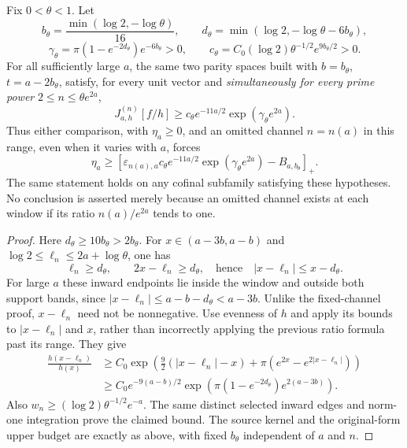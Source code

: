 \begin{proposition}
\label{prop:ns43-moving-channel}
Fix $0<\theta<1$. Let
\[
 b_\theta=\frac{\min(\log2,-\log\theta)}{16},\qquad
 d_\theta=\min(\log2,-\log\theta-6b_\theta),
\]
\[
 \gamma_\theta=\pi(1-e^{-2d_\theta})e^{-6b_\theta}>0,
 \qquad c_\theta=C_0(\log2)\theta^{-1/2}e^{9b_\theta/2}>0.
\]
For all sufficiently large $a$, the same two parity spaces built with
$b=b_\theta$, $t=a-2b_\theta$, satisfy, for every unit vector and
\emph{simultaneously for every prime power} $2\le n\le\theta e^{2a}$,
\[
 J^{(n)}_{a,h}[f/h]\ge
 c_\theta e^{-11a/2}\exp(\gamma_\theta e^{2a}).
\]
Thus either comparison, with $\eta_a\ge0$, and an omitted channel
$n=n(a)$ in this range, even when it varies with $a$, forces
\[
 \eta_a\ge
 [\varepsilon_{n(a),a}c_\theta e^{-11a/2}
             \exp(\gamma_\theta e^{2a})-B_{a,b_\theta}]_+.
\]
The same statement holds on any cofinal subfamily satisfying these
hypotheses. No conclusion is asserted merely because an omitted
channel exists at each window if its ratio $n(a)/e^{2a}$ tends to one.
\end{proposition}
\begin{proof}
Here $d_\theta\ge10b_\theta>2b_\theta$. For $x\in(a-3b,a-b)$ and
$\log2\le\ell_n\le2a+\log\theta$, one has
\[
 \ell_n\ge d_\theta,\qquad 2x-\ell_n\ge d_\theta,
 \quad\text{hence}\quad |x-\ell_n|\le x-d_\theta.
\]
For large $a$ these inward endpoints lie inside the window and outside
both support bands, since
$|x-\ell_n|\le a-b-d_\theta<a-3b$. Unlike the fixed-channel proof,
$x-\ell_n$ need not be nonnegative. Use evenness of $h$ and apply its
bounds to $|x-\ell_n|$ and $x$, rather than incorrectly applying the
previous ratio formula past its range. They give
\begin{align*}
 \frac{h(x-\ell_n)}{h(x)}
 &\ge C_0\exp\!\left(\tfrac92(|x-\ell_n|-x)
                   +\pi(e^{2x}-e^{2|x-\ell_n|})\right)\\
 &\ge C_0e^{-9(a-b)/2}
                \exp\!\left(\pi(1-e^{-2d_\theta})e^{2(a-3b)}\right).
\end{align*}
Also $w_n\ge(\log2)\theta^{-1/2}e^{-a}$. The same distinct selected
inward edges and norm-one integration prove the claimed bound. The
source kernel and the original-form upper budget are exactly as above,
with fixed $b_\theta$ independent of $a$ and $n$.
\end{proof}

